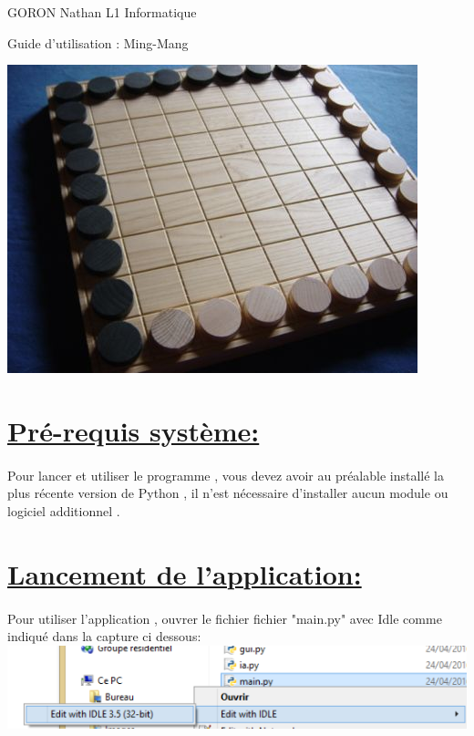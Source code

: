 \documentclass[a4paper,12pt]{article}
\begin{document}
\begin{flushleft}
GORON Nathan
\newline
L1 Informatique
\vspace{1cm}
\end{flushleft}
\begin{center}
\begin{Huge}{Guide d'utilisation : Ming-Mang}
\end{Huge}
\newline
\newline
\newline
\newline
\newline
\newline
\includegraphics[scale=0.5]{imagesmanuel/mingmang.jpg}
\end{center}

\newpage

\section{\underline{Pré-requis système:}}
\paragraph{}
Pour lancer et utiliser le programme , vous devez avoir au préalable installé
la plus récente version de Python , il n'est nécessaire d'installer aucun module ou logiciel
additionnel .

\section{\underline{Lancement de l'application:}}
\paragraph{}
Pour utiliser l'application , ouvrer le fichier fichier "main.py" avec Idle comme
indiqué dans la capture ci dessous:
\newline
\includegraphics[scale=1]{imagesmanuel/lancement.png}
\newline
\end{document}
